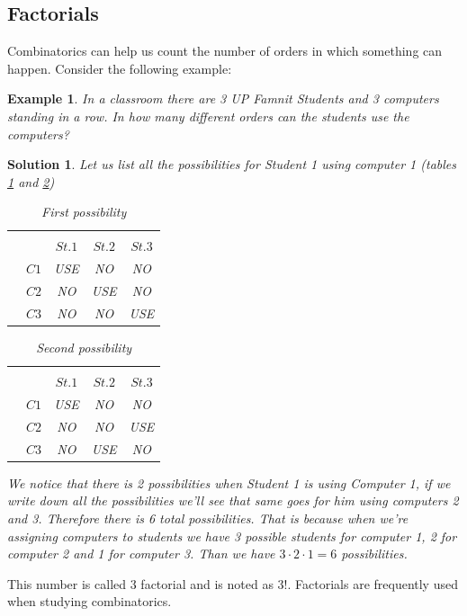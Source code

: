 \documentclass[11pt,a4paper]{article}
\newtheorem{ex}{Example}
\newtheorem{sol}{Solution}
\begin{document}
	\subsection{Factorials}
	Combinatorics can help us count the number of orders in which something can happen. Consider the following example:
	\begin{ex}
		In a classroom there are 3 UP Famnit Students and 3 computers standing in a row. In how many different orders can the students use the computers?
	\end{ex}
	\begin{sol}
		Let us list all the possibilities for Student 1 using computer 1 (tables \ref{tab: First} and \ref{tab: Second})\\
		
		\begin{table}
			
			\begin{tabular}{cc|c|c|c|}
				& \multicolumn{1}{c}{}  \\
				& \multicolumn{1}{c}{} & \multicolumn{1}{c}{$St. 1$}  & \multicolumn{1}{c}{$St. 2$}  & \multicolumn{1}{c}{$St. 3$} \\\cline{3-5}
				& $C1$ & USE & NO & NO \\ \cline{3-5}
				& $C2$ & NO & USE & NO \\\cline{3-5}
				& $C3$ & NO & NO & USE \\\cline{3-5}
			\end{tabular}
			\label{tab: First}
			\caption{First possibility}
		\end{table}
	
	\begin{table}
		
		\begin{tabular}{cc|c|c|c|}
			& \multicolumn{1}{c}{}  \\
			& \multicolumn{1}{c}{} & \multicolumn{1}{c}{$St. 1$}  & \multicolumn{1}{c}{$St. 2$}  & \multicolumn{1}{c}{$St. 3$} \\\cline{3-5}
			& $C1$ & USE & NO & NO \\ \cline{3-5}
			& $C2$ & NO & NO & USE \\\cline{3-5}
			& $C3$ & NO & USE & NO \\\cline{3-5}
		\end{tabular}
		\label{tab: Second}
		\caption{Second possibility}
	\end{table}
	
		
		We notice that there is 2 possibilities when Student 1 is using Computer 1, if we write down all the possibilities we'll see that same goes for him using computers 2 and 3. Therefore there is 6 total possibilities. That is because when we're assigning computers to students we have 3 possible students for computer 1, 2 for computer 2 and  1 for computer 3. Than we have $3 \cdot 2 \cdot 1 = 6$ possibilities. 
		 
	\end{sol}
This number is called 3 factorial and is noted as $3!$. Factorials are frequently used when studying combinatorics. 
\end{document}
